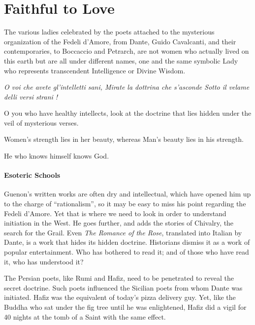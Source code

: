 \section{Faithful to Love}

\begin{quotex}
The various ladies celebrated by the poets attached to the mysterious organization of the Fedeli d'Amore, from Dante, Guido Cavalcanti, and their contemporaries, to Boccaccio and Petrarch, are not women who actually lived on this earth but are all under different names, one and the same symbolic Lady who represents transcendent Intelligence or Divine Wisdom. 

\emph{O voi che avete gl'intelletti sani, Mirate la dottrina che s'asconde Sotto il velame delli versi strani !}

O you who have healthy intellects, look at the doctrine that lies hidden under the veil of mysterious verses. 

Women's strength lies in her beauty, whereas Man's beauty lies in his strength. 

He who knows himself knows God. 

\end{quotex}
\paragraph{Esoteric Schools}
Guenon's written works are often dry and intellectual, which have opened him up to the charge of “rationalism”, so it may be easy to miss his point regarding the Fedeli d'Amore. Yet that is where we need to look in order to understand initiation in the West. He goes further, and adds the stories of Chivalry, the search for the Grail. Even \emph{The Romance of the Rose}, translated into Italian by Dante, is a work that hides its hidden doctrine. Historians dismiss it as a work of popular entertainment. Who has bothered to read it; and of those who have read it, who has understood it?

The Persian poets, like Rumi and Hafiz, need to be penetrated to reveal the secret doctrine. Such poets influenced the Sicilian poets from whom Dante was initiated. Hafiz was the equivalent of today's pizza delivery guy. Yet, like the Buddha who sat under the fig tree until he was enlightened, Hafiz did a vigil for 40 nights at the tomb of a Saint with the same effect.

